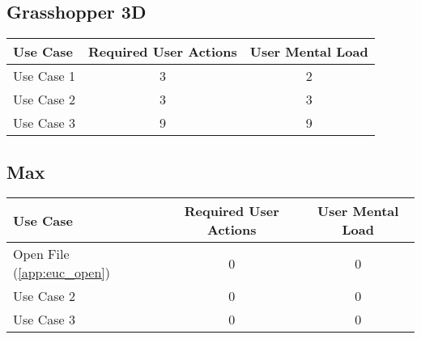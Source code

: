 \subsection{Grasshopper 3D}




\begin{tabularx}{\textwidth}{Xcc}
\textbf{Use Case} & \textbf{Required User Actions} & \textbf{User Mental Load}\\
\hline
Use Case 1                          & 3 & 2 \\
Use Case 2                          & 3 & 3 \\
Use Case 3                          & 9 & 9
\end{tabularx}

\subsection{Max}

\begin{tabularx}{\textwidth}{Xcc}
\textbf{Use Case} & \textbf{Required User Actions} & \textbf{User Mental Load}\\
\hline
Open File (\ref{app:euc_open}) & 0 & 0 \\
Use Case 2                     & 0 & 0 \\
Use Case 3                     & 0 & 0
\end{tabularx}

